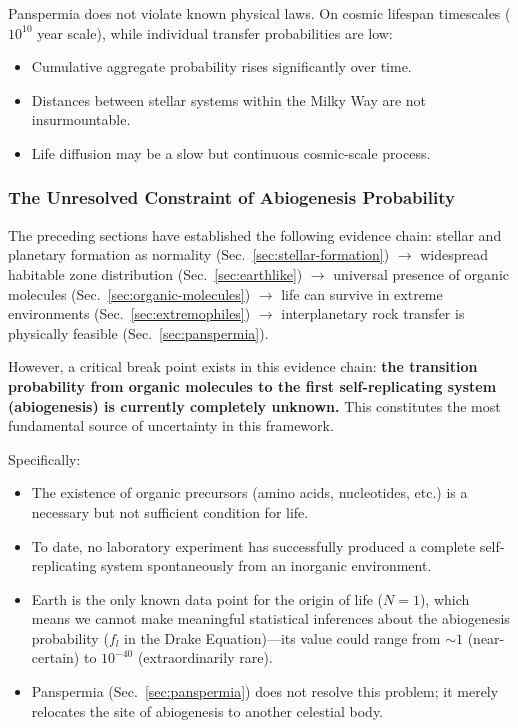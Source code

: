 \documentclass[aps,prd,twocolumn,superscriptaddress,nofootinbib]{revtex4-2}
\begin{document}
Panspermia does not violate known physical laws. On cosmic lifespan timescales ($10^{10}$ year scale), while individual transfer probabilities are low:

\begin{itemize}
  \item Cumulative aggregate probability rises significantly over time.
  \item Distances between stellar systems within the Milky Way are not insurmountable.
  \item Life diffusion may be a slow but continuous cosmic-scale process.
\end{itemize}

\subsubsection{The Unresolved Constraint of Abiogenesis Probability}\label{sec:abiogenesis}

The preceding sections have established the following evidence chain: stellar and planetary formation as normality (Sec.~\ref{sec:stellar-formation}) $\to$ widespread habitable zone distribution (Sec.~\ref{sec:earthlike}) $\to$ universal presence of organic molecules (Sec.~\ref{sec:organic-molecules}) $\to$ life can survive in extreme environments (Sec.~\ref{sec:extremophiles}) $\to$ interplanetary rock transfer is physically feasible (Sec.~\ref{sec:panspermia}).

However, a critical break point exists in this evidence chain: \textbf{the transition probability from organic molecules to the first self-replicating system (abiogenesis) is currently completely unknown.} This constitutes the most fundamental source of uncertainty in this framework.

Specifically:

\begin{itemize}
  \item The existence of organic precursors (amino acids, nucleotides, etc.) is a necessary but not sufficient condition for life.
  \item To date, no laboratory experiment has successfully produced a complete self-replicating system spontaneously from an inorganic environment.
  \item Earth is the only known data point for the origin of life ($N=1$), which means we cannot make meaningful statistical inferences about the abiogenesis probability ($f_l$ in the Drake Equation)---its value could range from ${\sim}1$ (near-certain) to $10^{-40}$ (extraordinarily rare).
  \item Panspermia (Sec.~\ref{sec:panspermia}) does not resolve this problem; it merely relocates the site of abiogenesis to another celestial body.
\end{itemize}
\end{document}
